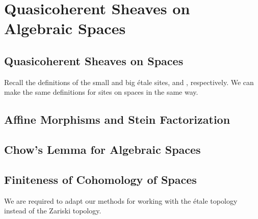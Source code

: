 \section{Quasicoherent Sheaves on Algebraic Spaces}\label{sec: quasicoherent sheaves on algebraic spaces}
\subsection{Quasicoherent Sheaves on Spaces}
Recall the definitions of the small and big \'{e}tale sites,  and , respectively. We can make the same definitions for sites on spaces in the same way. 
\begin{definition}\label{def: small etale site on spaces}
    
\end{definition}
\begin{definition}\label{def: big etale site on spaces}
    
\end{definition}
\subsection{Affine Morphisms and Stein Factorization}
\subsection{Chow's Lemma for Algebraic Spaces}
\subsection{Finiteness of Cohomology of Spaces}
We are required to adapt our methods for working with the \'{e}tale topology instead of the Zariski topology. 